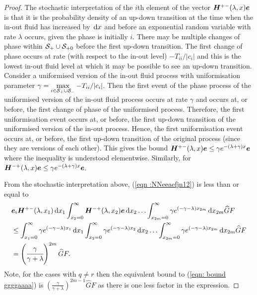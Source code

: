 \begin{proof}
	The stochastic interpretation of the \(i\)th element of the vector \(\boldsymbol H^{+-}(\lambda,x)\boldsymbol e\) is that it is the probability density of an up-down transition at the time when the in-out fluid has increased by \(\, \mathrm{d} x\) and before an exponential random variable with rate \(\lambda\) occurs, given the phase is initially \(i\). There may be multiple changes of phase within \(\mathcal S_+\cup\mathcal{S}_{+0}\) before the first up-down transition. The first change of phase occurs at rate (with respect to the in-out level) \(-T_{ii}/|c_i|\) and this is the lowest in-out fluid level at which it may be possible to see an up-down transition. Consider a uniformised version of the in-out fluid process with uniformisation parameter \(\gamma = \max\limits_{i\in\mathcal S_+\cup\mathcal{S}_-}-T_{ii}/|c_i|\). Then the first event of the phase process of the uniformised version of the in-out fluid process occurs at rate \(\gamma\) and occurs at, or before, the first change of phase of the uniformised process. Therefore, the first uniformisation event occurs at, or before, the first up-down transition of the uniformised version of the in-out process. Hence, the first uniformisation event occurs at, or before, the first up-down transition of the original process (since they are versions of each other). This gives the bound \(\boldsymbol H^{+-}(\lambda,x)\boldsymbol e\leq \gamma e^{-(\lambda + \gamma)x}\boldsymbol e\) where the inequality is understood elementwise. Similarly, for \(\boldsymbol H^{-+}(\lambda,x)\boldsymbol e\leq \gamma e^{-(\lambda + \gamma)x}\boldsymbol e\).
	
	From the stochastic interpretation above, (\ref{eqn :NNeeaefjn12}) is less than or equal to 
	\begin{align}
	&\boldsymbol e_i \boldsymbol H^{+-}(\lambda,x_1) \, \mathrm{d} x_1 \int_{x_2=0}^\infty \boldsymbol H^{-+}(\lambda,x_2) \boldsymbol e \, \mathrm{d} x_2  
				\hdots \int_{x_{2m}=0}^\infty \gamma e^{(-\gamma-\lambda)x_{2m}}\, \mathrm{d} x_{2m}\widehat GF\nonumber
	\\&\leq \int_{x_1=0}^\infty \gamma e^{(-\gamma-\lambda)x_1}  \, \mathrm{d} x_1 \int_{x_2=0}^\infty \gamma e^{(-\gamma-\lambda)x_2}  \, \mathrm{d} x_2  
				\hdots \int_{x_{2m}=0}^\infty \gamma e^{(-\gamma-\lambda)x_{2m}}\, \mathrm{d} x_{2m}\widehat GF \nonumber
	\\&= \left(\cfrac{\gamma}{\gamma+\lambda}\right)^{2m}\widehat GF.\label{eqn: bound ggggaaaa}
	\end{align}
	Note, for the cases with \(q\neq r\) then the equivalent bound to (\ref{eqn: bound ggggaaaa}) is \(\left(\frac{\gamma}{\gamma+\lambda}\right)^{2m-1}\widehat GF\) as there is one less factor in the expression. 


\end{proof}
